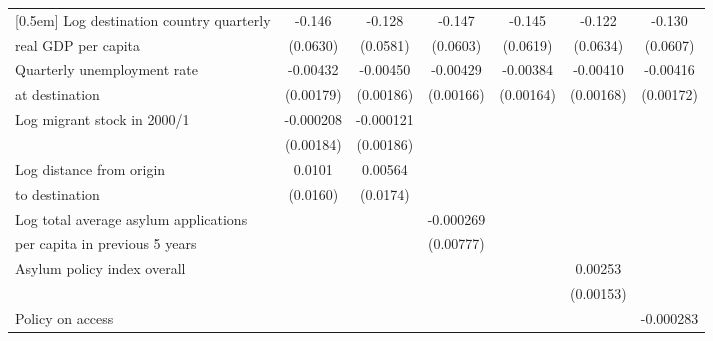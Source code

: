 \begin{table}[!ht]
\begin{tabular}{l*{6}{c}}
[0.5em]
Log destination country quarterly &      -0.146\sym{*}  &      -0.128\sym{*}  &      -0.147\sym{*}  &      -0.145\sym{*}  &      -0.122         &      -0.130\sym{*}  \\
real GDP per capita                    &    (0.0630)         &    (0.0581)         &    (0.0603)         &    (0.0619)         &    (0.0634)         &    (0.0607)         \\
[0.5em]
Quarterly unemployment rate &    -0.00432\sym{*}  &    -0.00450\sym{*}  &    -0.00429\sym{*}  &    -0.00384\sym{*}  &    -0.00410\sym{*}  &    -0.00416\sym{*}  \\
at destination                    &   (0.00179)         &   (0.00186)         &   (0.00166)         &   (0.00164)         &   (0.00168)         &   (0.00172)         \\
[0.5em]
Log migrant stock in 2000/1&   -0.000208         &   -0.000121         &                     &                     &                     &                     \\
                    &   (0.00184)         &   (0.00186)         &                     &                     &                     &                     \\
[0.5em]
Log distance from origin &      0.0101         &     0.00564         &                     &                     &                     &                     \\
to destination                    &    (0.0160)         &    (0.0174)         &                     &                     &                     &                     \\
[0.5em]
Log total average asylum applications &                     &                     &   -0.000269         &                     &                     &                     \\
per capita in previous 5 years                    &                     &                     &   (0.00777)         &                     &                     &                     \\
[0.5em]
Asylum policy index overall&                     &                     &                     &                     &     0.00253         &                     \\
                    &                     &                     &                     &                     &   (0.00153)         &                     \\
[0.5em]
Policy on access    &                     &                     &                     &                     &                     &   -0.000283         \\

\end{tabular}
\end{table}
